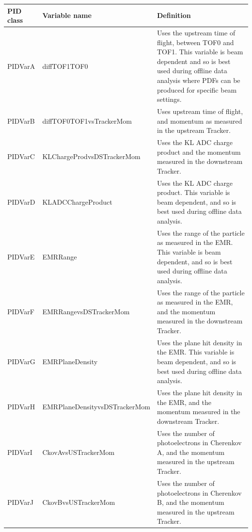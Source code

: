 \vspace {0.5cm}
\begin{tabular}{| l | l | p{7cm} |}
  \hline                       
  \textbf{PID class} & \textbf{Variable name} & \textbf{Definition} \\\hline
  PIDVarA & diffTOF1TOF0 & Uses the upstream time of flight, between TOF0 and TOF1. This variable is beam dependent and so is best used during offline data analysis where PDFs can be produced for specific beam settings. \\\hline
  PIDVarB & diffTOF0TOF1vsTrackerMom & Uses upstream time of flight, and momentum as measured in the upstream Tracker. \\\hline
  PIDVarC & KLChargeProdvsDSTrackerMom & Uses the KL ADC charge product and the momentum measured in the downstream Tracker. \\\hline
  PIDVarD & KLADCChargeProduct & Uses the KL ADC charge product. This variable is beam dependent, and so is best used during offline data analysis.\\\hline
  PIDVarE & EMRRange & Uses the range of the particle as measured in the EMR. This variable is beam dependent, and so is best used during offline data analysis. \\\hline
  PIDVarF & EMRRangevsDSTrackerMom & Uses the range of the particle as measured in the EMR, and the momentum measured in the downstream Tracker. \\\hline
  PIDVarG & EMRPlaneDensity & Uses the plane hit density in the EMR. This variable is beam dependent, and so is best used during offline data analysis.\\\hline
  PIDVarH & EMRPlaneDensityvsDSTrackerMom & Uses the plane hit density in the EMR, and the momentum measured in the downstream Tracker.\\\hline
  PIDVarI & CkovAvsUSTrackerMom & Uses the number of photoelectrons in Cherenkov A, and the momentum measured in the upstream Tracker.\\\hline
  PIDVarJ & CkovBvsUSTrackerMom & Uses the number of photoelectrons in Cherenkov B, and the momentum measured in the upstream Tracker.\\
  \hline 
\end{tabular}

